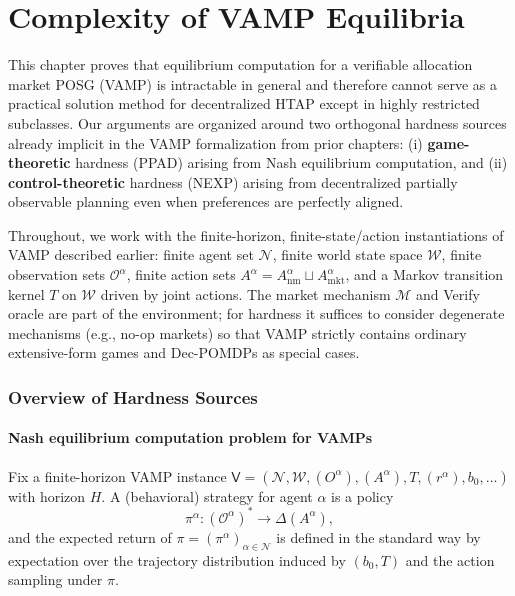 \chapter{Complexity of VAMP Equilibria}\label{chap:equilibria}

This chapter proves that equilibrium computation for a verifiable allocation market POSG (VAMP) is intractable in general and therefore cannot serve as a practical solution method for decentralized HTAP except in highly restricted subclasses. Our arguments are organized around two orthogonal hardness sources already implicit in the VAMP formalization from prior chapters: (i) \textbf{game-theoretic} hardness (PPAD) arising from Nash equilibrium computation, and (ii) \textbf{control-theoretic} hardness (NEXP) arising from decentralized partially observable planning even when preferences are perfectly aligned.

Throughout, we work with the finite-horizon, finite-state/action instantiations of VAMP described earlier: finite agent set \(\mathcal N\), finite world state space \(\mathcal W\), finite observation sets \(\mathcal O^\alpha\), finite action sets \(A^\alpha = A^\alpha_{\mathrm{nm}}\sqcup A^\alpha_{\mathrm{mkt}}\), and a Markov transition kernel \(T\) on \(\mathcal W\) driven by joint actions. The market mechanism \(\mathcal M\) and Verify oracle are part of the environment; for hardness it suffices to consider degenerate mechanisms (e.g., no-op markets) so that VAMP strictly contains ordinary extensive-form games and Dec-POMDPs as special cases.

\subsection{Overview of Hardness Sources}

\subsubsection{Nash equilibrium computation problem for VAMPs}

Fix a finite-horizon VAMP instance \(\mathsf V=(\mathcal N,\mathcal W,(O^\alpha),(A^\alpha),T,(r^\alpha),b_0,\dots)\) with horizon \(H\). A (behavioral) strategy for agent \(\alpha\) is a policy
\[
\pi^\alpha : (\mathcal O^\alpha)^* \to \Delta(A^\alpha),
\]
and the expected return of \(\pi=(\pi^\alpha)_{\alpha\in\mathcal N}\) is defined in the standard way by expectation over the trajectory distribution induced by \((b_0,T)\) and the action sampling under \(\pi\).


